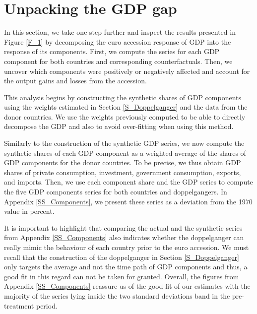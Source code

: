 \documentclass[12pt]{article}
\begin{document}


\section{Unpacking the GDP gap \label{S_Components}}

In this section, we take one step further and inspect the results presented in Figure \ref{F_1} by decomposing the euro accession response of GDP into the response of its components. First, we compute the series for each GDP component for both countries and corresponding counterfactuals. Then, we uncover which components were positively or negatively affected and account for the output gains and losses from the accession. 

This analysis begins by constructing the synthetic shares of GDP components using the weights estimated in Section \ref{S_Doppelganger} and the data from the donor countries. We use the weights previously computed to be able to directly decompose the GDP and also to avoid over-fitting when using this method.

Similarly to the construction of the synthetic GDP series, we now compute the synthetic shares of each GDP component as a weighted average of the shares of GDP components for the donor countries. To be precise, we thus obtain GDP shares of private consumption, investment, government consumption, exports, and imports. Then, we use each component share and the GDP series to compute the five GDP components series for both countries and doppelgangers. In Appendix \ref{SS_Components}, we present these series as a deviation from the 1970 value in percent.

It is important to highlight that comparing the actual and the synthetic series from Appendix \ref{SS_Components} also indicates whether the doppelganger can really mimic the behaviour of each country prior to the euro accession. We must recall that the construction of the doppelganger in Section \ref{S_Doppelganger} only targets the average and not the time path of GDP components and thus, a good fit in this regard can not be taken for granted. Overall, the figures from Appendix \ref{SS_Components} reassure us of the good fit of our estimates with the majority of the series lying inside the two standard deviations band in the pre-treatment period. 
\end{document}
